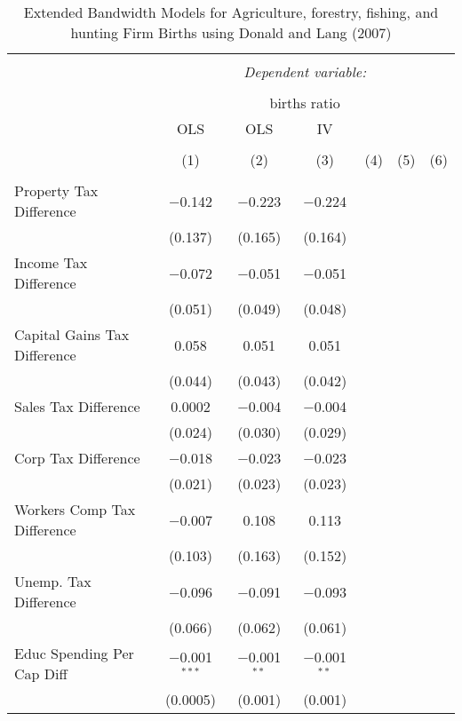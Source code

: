 
\begin{table}[!htbp] \centering 
  \caption{Extended Bandwidth Models for  Agriculture, forestry, fishing, and hunting Firm Births using Donald and Lang (2007)} 
  \label{} 
\begin{tabular}{@{\extracolsep{5pt}}lcccccc} 
\\[-1.8ex]\hline 
\hline \\[-1.8ex] 
 & \multicolumn{6}{c}{\textit{Dependent variable:}} \\ 
\cline{2-7} 
\\[-1.8ex] & \multicolumn{6}{c}{births ratio} \\ 
 & OLS & OLS & IV &  &  &  \\ 
\\[-1.8ex] & (1) & (2) & (3) & (4) & (5) & (6)\\ 
\hline \\[-1.8ex] 
 Property Tax Difference & $-$0.142 & $-$0.223 & $-$0.224 &  &  &  \\ 
  & (0.137) & (0.165) & (0.164) &  &  &  \\ 
  Income Tax Difference & $-$0.072 & $-$0.051 & $-$0.051 &  &  &  \\ 
  & (0.051) & (0.049) & (0.048) &  &  &  \\ 
  Capital Gains Tax Difference & 0.058 & 0.051 & 0.051 &  &  &  \\ 
  & (0.044) & (0.043) & (0.042) &  &  &  \\ 
  Sales Tax Difference & 0.0002 & $-$0.004 & $-$0.004 &  &  &  \\ 
  & (0.024) & (0.030) & (0.029) &  &  &  \\ 
  Corp Tax Difference & $-$0.018 & $-$0.023 & $-$0.023 &  &  &  \\ 
  & (0.021) & (0.023) & (0.023) &  &  &  \\ 
  Workers Comp Tax Difference & $-$0.007 & 0.108 & 0.113 &  &  &  \\ 
  & (0.103) & (0.163) & (0.152) &  &  &  \\ 
  Unemp. Tax Difference & $-$0.096 & $-$0.091 & $-$0.093 &  &  &  \\ 
  & (0.066) & (0.062) & (0.061) &  &  &  \\ 
  Educ Spending Per Cap Diff & $-$0.001$^{***}$ & $-$0.001$^{**}$ & $-$0.001$^{**}$ &  &  &  \\ 
  & (0.0005) & (0.001) & (0.001) &  &  &  \\ 

\end{tabular}
\end{table}

